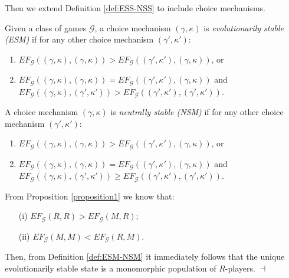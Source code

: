 \documentclass[fleqn,reqno,11pt]{article}
\begin{document}
\medskip{}

\noindent Then we extend Definition \ref{def:ESS-NSS} to include choice mechanisms. 

\begin{definition} \label{def:ESM-NSM}
Given a class of games $\mathcal{G}$, a choice mechanism $(\gamma, \kappa)$ is \emph{evolutionarily stable
(ESM)} if for any other choice mechanism $(\gamma', \kappa')$:
\begin{enumerate}
\item $EF_{\mathcal{G}}((\gamma, \kappa),(\gamma, \kappa))>EF_{\mathcal{G}}((\gamma', \kappa'),(\gamma, \kappa))$, or
\item $EF_{\mathcal{G}}((\gamma, \kappa),(\gamma, \kappa))=EF_{\mathcal{G}}((\gamma', \kappa'),(\gamma, \kappa))$ and $EF_{\mathcal{G}}((\gamma, \kappa),(\gamma', \kappa'))>EF_{\mathcal{G}}((\gamma', \kappa'),(\gamma', \kappa'))$.
\end{enumerate}
\noindent A choice mechanism $(\gamma, \kappa)$ is \emph{neutrally stable (NSM)} if
for any other choice mechanism $(\gamma', \kappa')$:
\begin{enumerate}
\item $EF_{\mathcal{G}}((\gamma, \kappa),(\gamma, \kappa))>EF_{\mathcal{G}}((\gamma', \kappa'),(\gamma, \kappa))$, or
\item $EF_{\mathcal{G}}((\gamma, \kappa),(\gamma, \kappa))= EF_{\mathcal{G}}((\gamma', \kappa'),(\gamma, \kappa))$ and $EF_{\mathcal{G}}((\gamma, \kappa),(\gamma', \kappa'))\geq EF_{\mathcal{G}}((\gamma', \kappa'),(\gamma', \kappa'))$.
\end{enumerate}
\end{definition}

\noindent From Proposition \ref{proposition1} we know that: 

\begin{itemize}
\item[(i)] $EF_{\mathcal{G}}(R,R)>EF_{\mathcal{G}}(M,R);$
\item[(ii)] $EF_{\mathcal{G}}(M,M)<EF_{\mathcal{G}}(R,M).$
\end{itemize}

\noindent Then, from Definition \ref{def:ESM-NSM} it immediately follows that the unique evolutionarily stable state is a monomorphic population of $R$-players. $\dashv$




\printbibliography[heading=bibintoc]




\iffalse
\end{document}
